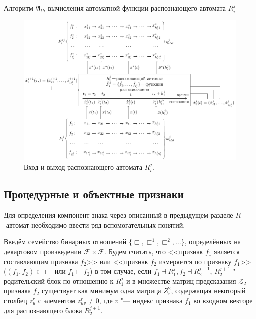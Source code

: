 \documentclass[a4paper, 12pt]{article}
\renewcommand{\baselinestretch}{2}
\theoremstyle{plain}
\begin{document}
\renewcommand{\baselinestretch}{1}
	\begin{algorithm}
		\caption{Алгоритм $\mathfrak{A}_{th}$ вычисления автоматной функции распознающего автомата $R_i^j$}\label{alg:automato}
		\begin{algorithmic}[1]
			
			
		\end{algorithmic}
	\end{algorithm}
\renewcommand{\baselinestretch}{2}	
	\begin{figure}[H]
		\centering
		\includegraphics[width=1.0\linewidth]{rb_io}
		\caption{Вход и выход распознающего автомата $R_i^j$.}
		\label{fig:rb_io}
	\end{figure}
	
	\subsection{Процедурные и объектные признаки}
		Для определения компонент знака через описанный в предыдущем разделе $R$-автомат необходимо ввести ряд вспомогательных понятий. 
		
		Введём семейство бинарных отношений $\{\sqsubset,\sqsubset^1,\sqsubset^2,\dots\}$, определённых на декартовом произведении $\mathcal F\times \mathcal F$. Будем считать, что <<признак $f_1$ является составляющим признака $f_2$>> или <<признак $f_2$ измеряется по признаку $f_1$>> ($(f_1,f_2 )\in\sqsubset$ или $f_1\sqsubset f_2$) в том случае, если $f_1\dashv R_1^j, f_2\dashv R_2^{j+1}$, $R_2^{j+1}$ "--- родительский блок по отношению к $R_1^j$ и в множестве матриц предсказания $\mathcal Z_2$ признака $f_2$ существует как минимум одна матрица $Z_r^2$, содержащая некоторый столбец $\bar z_u^r$ с элементом $z_{uv}^r\not=0$, где $v$ "--- индекс признака $f_1$ во входном векторе для распознающего блока $R_2^{j+1}$.
		
\end{document}
